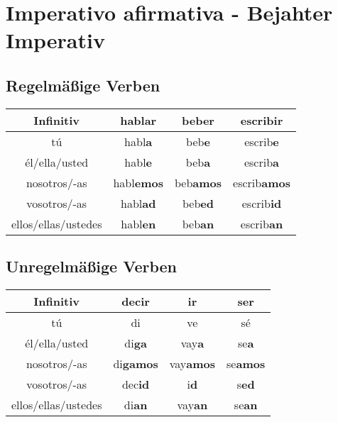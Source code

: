 \section{Imperativo afirmativa - Bejahter Imperativ}
\subsection{Regelmäßige Verben}

\begin{tabular}{cccc}
\hline
Infinitiv               & hablar            & beber             & escribir                  \\
\hline
tú                      & habl\textbf{a}    & beb\textbf{e}     & escrib\textbf{e}          \\
él/ella/usted           & habl\textbf{e}    & beb\textbf{a}     & escrib\textbf{a}          \\
nosotros/-as            & habl\textbf{emos} & beb\textbf{amos}     & escrib\textbf{amos}    \\
vosotros/-as            & habl\textbf{ad}   & beb\textbf{ed}     & escrib\textbf{id}        \\
ellos/ellas/ustedes     & habl\textbf{en}   & beb\textbf{an}     & escrib\textbf{an}        \\
\hline
\end{tabular}

\subsection{Unregelmäßige Verben}

\begin{tabular}{cccc}
\hline
Infinitiv               & decir            & ir                 & ser                  \\
\hline
tú                      & di               & ve                 & sé          \\
él/ella/usted           & di\textbf{ga}    & vay\textbf{a}      & se\textbf{a}          \\
nosotros/-as            & di\textbf{gamos} & vay\textbf{amos}   & se\textbf{amos}    \\
vosotros/-as            & dec\textbf{id}   & i\textbf{d}        & s\textbf{ed}        \\
ellos/ellas/ustedes     & di\textbf{an}    & vay\textbf{an}     & se\textbf{an}        \\
\hline
\end{tabular}
